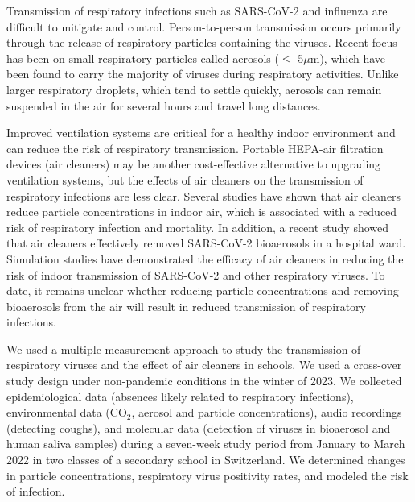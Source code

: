 \documentclass[fleqn,11pt]{wlscirep}
\begin{document}
Transmission of respiratory infections such as SARS-CoV-2 and influenza are difficult to mitigate and control. Person-to-person transmission occurs primarily through the release of respiratory particles containing the viruses. Recent focus has been on small respiratory particles called aerosols ($\leq$ 5$\mu$m), which have been found to carry the majority of viruses during respiratory activities\cite{Fennelly2020}. Unlike larger respiratory droplets, which tend to settle quickly, aerosols can remain suspended in the air for several hours and travel long distances\cite{Coleman2022,Wang2020,Heneghan2021}.

Improved ventilation systems are critical for a healthy indoor environment and can reduce the risk of respiratory transmission\cite{Wang2021,Morawska2021}. Portable HEPA-air filtration devices (air cleaners) may be another cost-effective alternative to upgrading ventilation systems, but the effects of air cleaners on the transmission of respiratory infections are less clear. Several studies have shown that air cleaners reduce particle concentrations in indoor air\cite{Park2020Build,Buising2022InfContr,Banholzer2023PLoSMed}, which is associated with a reduced risk of respiratory infection and mortality\cite{Gordon2014Resp,Kelly2023Atmos,DeAngelis2021EnvRes}. In addition, a recent study showed that air cleaners effectively removed SARS-CoV-2 bioaerosols in a hospital ward\cite{Morris2022}. Simulation studies have demonstrated the efficacy of air cleaners in reducing the risk of indoor transmission  of SARS-CoV-2\cite{Lindsley2021} and other respiratory viruses\cite{Cortellessa2023Build}. %
To date, it remains unclear whether reducing particle concentrations and removing bioaerosols from the air will result in reduced transmission of respiratory infections. 

We used a multiple-measurement approach to study the transmission of respiratory viruses and the effect of air cleaners in schools. We used a cross-over study design under non-pandemic conditions in the winter of 2023. We collected epidemiological data (absences likely related to respiratory infections), environmental data (CO$_2$, aerosol and particle concentrations), audio recordings (detecting coughs), and molecular data (detection of viruses in bioaerosol and human saliva samples) during a seven-week study period from January to March 2022 in two classes of a secondary school in Switzerland. We determined changes in particle concentrations, respiratory virus positivity rates, and modeled the risk of infection.
\end{document}
